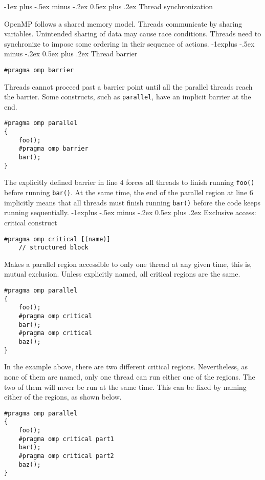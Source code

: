 \documentclass[10pt,landscape]{article}
\makeatletter
\renewcommand{\section}{\@startsection{section}{1}{0mm}%
                                {-1ex plus -.5ex minus -.2ex}%
                                {0.5ex plus .2ex}%
                                {\normalfont\large\bfseries}}
\renewcommand{\subsection}{\@startsection{subsection}{2}{0mm}%
                                {-1explus -.5ex minus -.2ex}%
                                {0.5ex plus .2ex}%
                                {\normalfont\normalsize\bfseries}}
\makeatother
\begin{document}
\begin{multicols}{3}
\section{Thread synchronization}
\par
OpenMP follows a shared memory model. Threads communicate by sharing variables. Unintended sharing of data may cause race conditions. Threads need to synchronize to impose some ordering in their sequence of actions.
\subsection{Thread barrier}
\begin{verbatim}
#pragma omp barrier
\end{verbatim}
\par
Threads cannot proceed past a barrier point until all the parallel threads reach the barrier. Some constructs, such as \texttt{parallel}, have an implicit barrier at the end.
\begin{verbatim}
#pragma omp parallel
{
    foo();
    #pragma omp barrier
    bar();
}
\end{verbatim}
\par
The explicitly defined barrier in line 4 forces all threads to finish running \texttt{foo()} before running \texttt{bar()}. At the same time, the end of the parallel region at line 6 implicitly means that all threads must finish running \texttt{bar()} before the code keeps running sequentially.
\subsection{Exclusive access: critical construct}
\begin{verbatim}
#pragma omp critical [(name)]
    // structured block
\end{verbatim}
\par
Makes a parallel region accessible to only one thread at any given time, this is, mutual exclusion. Unless explicitly named, all critical regions are the same.
\begin{verbatim}
#pragma omp parallel
{
    foo();
    #pragma omp critical
    bar();
    #pragma omp critical
    baz();
}
\end{verbatim}
\par
In the example above, there are two different critical regions. Nevertheless, as none of them are named, only one thread can run either one of the regions. The two of them will never be run at the same time. This can be fixed by naming either of the regions, as shown below.
\begin{verbatim}
#pragma omp parallel
{
    foo();
    #pragma omp critical part1
    bar();
    #pragma omp critical part2
    baz();
}
\end{verbatim}

\end{multicols}
\end{document}
